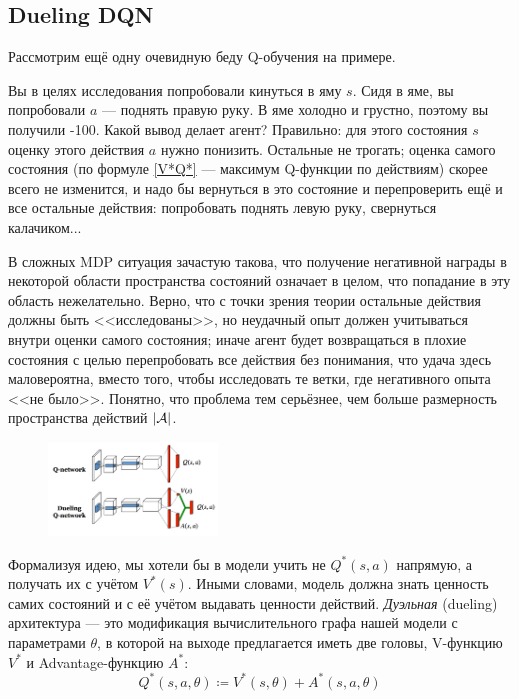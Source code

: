 \subsection{Dueling DQN}\label{subsec:duelingdqn}

Рассмотрим ещё одну очевидную беду Q-обучения на примере. 

\begin{example}
Вы в целях исследования попробовали кинуться в яму $s$. Сидя в яме, вы попробовали $a$ --- поднять правую руку. В яме холодно и грустно, поэтому вы получили -100. Какой вывод делает агент? Правильно: для этого состояния $s$ оценку этого действия $a$ нужно понизить. Остальные не трогать; оценка самого состояния (по формуле \eqref{V*Q*} --- максимум Q-функции по действиям) скорее всего не изменится, и надо бы вернуться в это состояние и перепроверить ещё и все остальные действия: попробовать поднять левую руку, свернуться калачиком...
\end{example}

В сложных MDP ситуация зачастую такова, что получение негативной награды в некоторой области пространства состояний означает в целом, что попадание в эту область нежелательно. Верно, что с точки зрения теории остальные действия должны быть <<исследованы>>, но неудачный опыт должен учитываться внутри оценки самого состояния; иначе агент будет возвращаться в плохие состояния с целью перепробовать все действия без понимания, что удача здесь маловероятна, вместо того, чтобы исследовать те ветки, где негативного опыта <<не было>>. Понятно, что проблема тем серьёзнее, чем больше размерность пространства действий $|\mathcal{A}|$.

\begin{figure}
\vspace{-0.5cm}
\centering
\includegraphics[width=0.4\textwidth]{Images/DuelingDQN.png}
\vspace{-0.5cm}
\end{figure}

Формализуя идею, мы хотели бы в модели учить не $Q^*(s, a)$ напрямую, а получать их с учётом $V^*(s)$. Иными словами, модель должна знать ценность самих состояний и с её учётом выдавать ценности действий. \emph{Дуэльная} (dueling) архитектура --- это модификация вычислительного графа нашей модели с параметрами $\theta$, в которой на выходе предлагается иметь две головы, V-функцию $V^*$ и Advantage-функцию $A^*$: 
\begin{equation}\label{naivedueling}
Q^*(s, a, \theta) \coloneqq V^*(s, \theta) + A^*(s, a, \theta)
\end{equation}

